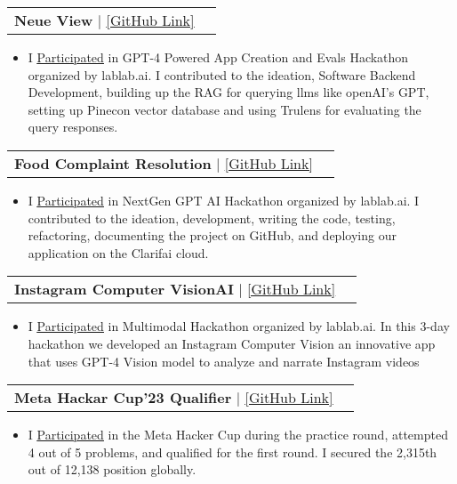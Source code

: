 \documentclass[letterpaper,11pt]{article}
\makeatletter
\newcommand{\resumeItem}[1]{
  \item\small{
    {#1 \vspace{-2pt}}
  }
}
\newcommand{\resumeProjectHeading}[2]{
    \item
    \begin{tabular*}{0.97\textwidth}{l@{\extracolsep{\fill}}r}
      \small#1 & #2 \\
    \end{tabular*}\vspace{-7pt}
}
\newcommand{\resumeItemListStart}{\begin{itemize}}
\newcommand{\resumeItemListEnd}{\end{itemize}\vspace{-5pt}}
\makeatother
\begin{document}
\resumeProjectHeading
{\textbf{Neue View} $|$ \href{https://github.com/inamprograms/neue-view}{\underline{[GitHub Link]}}}{}
\resumeItemListStart
\resumeItem{I \href{https://www.linkedin.com/feed/update/urn:li:activity:7166859396008943616/}{\underline{Participated}} in  GPT-4 Powered App Creation and Evals Hackathon organized by lablab.ai. I contributed to the ideation, Software Backend Development, building up the RAG for querying llms like openAI's GPT, setting up Pinecon vector database and using Trulens for evaluating the query responses.}
\resumeItemListEnd

\resumeProjectHeading
{\textbf{Food Complaint Resolution} $|$ \href{https://github.com/inamprograms/Food-complaint-resolution-app}{\underline{[GitHub Link]}}}{}
\resumeItemListStart
\resumeItem{I \href{https://www.linkedin.com/posts/inamulrehman_github-inamprogramsfood-complaint-resolution-app-activity-7155149817424289793-maPt?utm_source=share&utm_medium=member_desktop}{\underline{Participated}} in NextGen GPT AI Hackathon organized by lablab.ai. I contributed to the ideation, development, writing the code, testing, refactoring, documenting the project on GitHub, and deploying our application on the Clarifai cloud.}
\resumeItemListEnd

\resumeProjectHeading
{\textbf{Instagram Computer VisionAI} $|$ \href{https://github.com/inamprograms/InstagramComputerVisionAI}{\underline{[GitHub Link]}}}{}
\resumeItemListStart
\resumeItem{I \href{https://www.linkedin.com/posts/inamulrehman_github-louvivieninstagramcomputervisionai-activity-7132411114637656065-9ApD?utm_source=share&utm_medium=member_desktop}{\underline{Participated}} in Multimodal Hackathon organized by lablab.ai. In this 3-day hackathon we developed an Instagram Computer Vision an innovative app that uses GPT-4 Vision model to analyze and narrate Instagram videos}
\resumeItemListEnd

\resumeProjectHeading
{\textbf{Meta Hackar Cup'23 Qualifier} $|$ \href{https://github.com/inamprograms/Meta-hacker-cup-2023-Qualification-Round}{\underline{[GitHub Link]}}}{}
\resumeItemListStart
\resumeItem{I \href{https://www.linkedin.com/posts/inamulrehman_icodeguru-icodeguru-activity-7112400935330455552-bplE?utm_source=share&utm_medium=member_desktop}{\underline{Participated}} in the Meta Hacker Cup during the practice round, attempted 4 out of 5 problems, and qualified for the first round. I secured the 2,315th out of 12,138 position globally.}
\resumeItemListEnd
\end{document}
